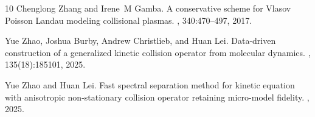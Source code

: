 \documentclass[preprint,1p,times]{elsarticle}
\theoremstyle{definition}
\theoremstyle{remark}
\begin{document}
\begin{thebibliography}{10}
Chenglong Zhang and Irene~M Gamba.
\newblock A conservative scheme for {V}lasov {P}oisson {L}andau modeling
  collisional plasmas.
, 340:470--497, 2017.

Yue Zhao, Joshua Burby, Andrew Christlieb, and Huan Lei.
\newblock Data-driven construction of a generalized kinetic collision operator
  from molecular dynamics.
, 135(18):185101, 2025.

Yue Zhao and Huan Lei.
\newblock Fast spectral separation method for kinetic equation with anisotropic
  non-stationary collision operator retaining micro-model fidelity.
, 2025.

\end{thebibliography}







\end{document}

